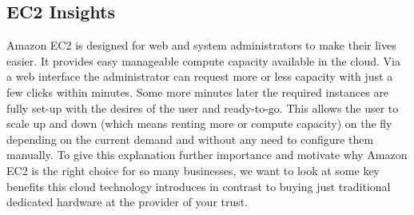 \subsection{EC2 Insights}
Amazon EC2 is designed for web and system administrators to make their lives easier. It provides easy manageable compute capacity available in the cloud. Via a web interface the administrator can request more or less capacity with just a few clicks within minutes. Some more minutes later the required instances are fully set-up with the desires of the user and ready-to-go. This allows the user to scale up and down (which means renting more or compute capacity) on the fly depending on the current demand and without any need to configure them manually. To give this explanation further importance and motivate why Amazon EC2 is the right choice for so many businesses, we want to look at some key benefits this cloud technology introduces in contrast to buying just traditional dedicated hardware at the provider of your trust. 